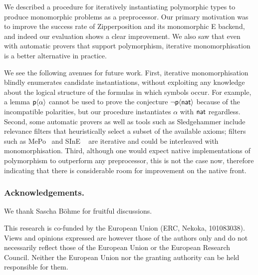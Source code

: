\documentclass[runningheads]{llncs}
\begin{document}
We described a procedure for iteratively instantiating polymorphic types to
produce monomorphic problems as a preprocessor. Our primary motivation was to
improve the success rate of Zipperposition and its monomorphic E backend, and
indeed our evaluation shows a clear improvement. We also saw that even with
automatic provers that support polymorphism, iterative monomorphisation is a
better alternative in practice.

We see the following avenues for future work. First, iterative monomorphisation
blindly enumerates candidate instantiations, without exploiting any knowledge
about the logical structure of the formulas in which symbols occur. For
example, a lemma $\textsf{p}\langle\alpha\rangle$ cannot be used to prove the
conjecture $\lnot \textsf{p}\langle\textsf{nat}\rangle$ because of the incompatible
polarities, but our procedure instantiates $\alpha$ with $\textsf{nat}$ regardless.
Second, some automatic provers as well as tools such as Sledgehammer include
relevance filters that heuristically select a subset of the available axioms;
filters such as MePo~\cite{meng-paulson-2009} and SInE
~\cite{hoder-voronkov-2011} are iterative and could be interleaved with
monomorphisation. Third, although one would expect native implementations of
polymorphism to outperform any preprocessor, this is not the case now, therefore indicating that there is considerable room for improvement on the native front.

\begin{credits}
   \subsubsection{Acknowledgements.}

   We thank Sascha Böhme for fruitful discussions.

   This research is co-funded by the European Union (ERC, Nekoka, 101083038). Views and opinions expressed are however those of the authors only and do not necessarily reflect those of the European Union or the European Research Council. Neither the European Union nor the granting authority can be held responsible for them.
\end{credits}



\end{document}
